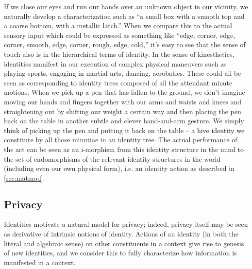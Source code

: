 \documentclass[pra,twocolumn,groupedaddress,10pt]{revtex4}
\theoremstyle{definition}
\begin{document}
If we close our eyes and run our hands over an unknown object in our vicinity, we naturally develop a characterization such as ``a small box with a smooth top and a coarse bottom, with a metallic latch.'' When we compare this to the actual sensory input which could be expressed as something like ``edge, corner, edge, corner, smooth, edge, corner, rough, edge, cold,'' it's easy to see that the sense of touch also is in the hierarchical terms of identity. In the sense of kinesthetics, identities manifest in our execution of complex physical maneuvers such as playing sports, engaging in martial arts, dancing, acrobatics. These could all be seen as corresponding to identity trees composed of all the attendant minute motions. When we pick up a pen that has fallen to the ground, we don't imagine moving our hands and fingers together with our arms and waists and knees and straightening out by shifting our weight a certain way and then placing the pen back on the table in another subtle and clever hand-and-arm gesture. We simply think of picking up the pen and putting it back on the table -- a hive identity we constitute by all those minutiae in an identity tree. The actual performance of the act can be seen as an i-morphism from this identity structure in the mind to the set of endomorphisms of the relevant identity structures in the world (including even our own physical form), i.e. an identity action as described in \autoref{sec:matmod}.

\subsection{Privacy} \label{sec:privacy}

Identities motivate a natural model for privacy; indeed, privacy itself may be seen as derivative of intrinsic notions of identity. Actions of an identity (in both the literal and algebraic sense) on other constituents in a context give rise to genesis of new identities, and we consider this to fully characterize how information is manifested in a context.
\end{document}
